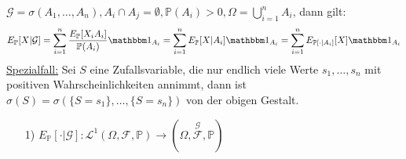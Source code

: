 \begin{ex}[Wichtig!]
$ \mathcal G=\sigma(A_{1},\hdots,A_{n}), A_{i}\cap A_{j}=\emptyset, \mathbb{P}(A_{i})>0,\Omega=\bigcup\limits_{i=1}^{n}A_{i} $, dann gilt:
\[ E_{\mathbb P}[X|\mathcal G]=\sum\limits_{i=1}^{n}\frac{E_{\mathbb P}[X_{i}A_{i}]}{\mathbb P(A_{i})}\mathbbm 1_{A_{i}}=\sum\limits_{i=1}^{n}E_{\mathbb P}[X|A_{i}]\mathbbm 1_{A_{i}}=\sum\limits_{i=1}^{n}E_{\mathbb P[\cdot|A_{i}]}[X]\mathbbm 1_{A_{i}} \]
\underline{Spezialfall:} Sei $ S $ eine Zufallsvariable, die nur endlich viele Werte $ s_{1},\hdots,s_{n} $ mit positiven Wahrscheinlichkeiten annimmt, dann ist $ \sigma(S)=\sigma(\{S=s_{1}\},\hdots,\{S=s_{n}\}) $ von der obigen Gestalt.
\end{ex}
\begin{lem}
\begin{enumerate}
\item[1)] $E_{\mathbb P}[\cdot|\mathcal G]:\mathcal L^{1}(\Omega,\mathcal F,\mathbb P)\to(\Omega, \overset{\mathcal G}{\mathcal F},\mathbb P) $
\end{enumerate}
\end{lem}
